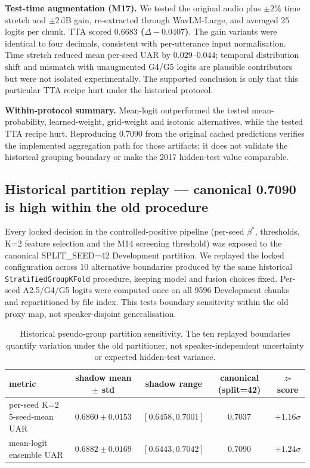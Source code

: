 \textbf{Test-time augmentation (M17).} We tested the original audio plus $\pm2\%$ time stretch and $\pm2$\,dB gain, re-extracted through WavLM-Large, and averaged 25 logits per chunk. TTA scored \textbf{$0.6683$ ($\Delta-0.0407$)}. The gain variants were identical to four decimals, consistent with per-utterance input normalisation. Time stretch reduced mean per-seed UAR by $0.029$--$0.044$; temporal distribution shift and mismatch with unaugmented G4/G5 logits are plausible contributors but were not isolated experimentally. The supported conclusion is only that this particular TTA recipe hurt under the historical protocol.

\textbf{Within-protocol summary.} Mean-logit outperformed the tested mean-probability, learned-weight, grid-weight and isotonic alternatives, while the tested TTA recipe hurt. Reproducing $0.7090$ from the original cached predictions verifies the implemented aggregation path for those artifacts; it does not validate the historical grouping boundary or make the 2017 hidden-test value comparable.

\subsection{Historical partition replay --- canonical 0.7090 is high within the old procedure}
\label{ssec:shadow_robustness}

Every locked decision in the controlled-positive pipeline (per-seed $\beta^*$, thresholds, K=2 feature selection and the M14 screening threshold) was exposed to the canonical SPLIT\_SEED=42 Development partition. We replayed the locked configuration across 10 alternative boundaries produced by the same historical \texttt{StratifiedGroupKFold} procedure, keeping model and fusion choices fixed. Per-seed A2.5/G4/G5 logits were computed once on all 9596 Development chunks and repartitioned by file index. This tests boundary sensitivity within the old proxy map, not speaker-disjoint generalisation.

\begin{table}[t]
\centering\small
\caption{Historical pseudo-group partition sensitivity. The ten replayed boundaries quantify variation under the old partitioner, not speaker-independent uncertainty or expected hidden-test variance.}
\label{tab:shadow_aggregate}
\begin{tabular}{lcccc}
\toprule
metric & shadow mean $\pm$ std & shadow range & canonical (split=42) & $z$-score \\
\midrule
per-seed K=2 5-seed-mean UAR & $0.6860 \pm 0.0153$ & $[0.6458, 0.7001]$ & $0.7037$ & $+1.16\sigma$ \\
mean-logit ensemble UAR      & $0.6882 \pm 0.0169$ & $[0.6443, 0.7042]$ & $0.7090$ & $+1.24\sigma$ \\
\bottomrule
\end{tabular}
\end{table}

